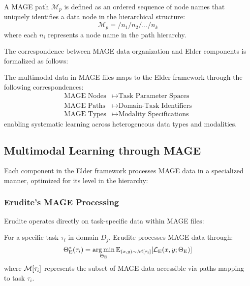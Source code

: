\begin{definition}
A MAGE path $\mathcal{M}_p$ is defined as an ordered sequence of node names that uniquely identifies a data node in the hierarchical structure:
\begin{equation}
\mathcal{M}_p = /n_1/n_2/.../n_k
\end{equation}
where each $n_i$ represents a node name in the path hierarchy.
\end{definition}

The correspondence between MAGE data organization and Elder components is formalized as follows:

\begin{proposition}
The multimodal data in MAGE files maps to the Elder framework through the following correspondences:
\begin{align}
\text{MAGE Nodes} &\mapsto \text{Task Parameter Spaces} \\
\text{MAGE Paths} &\mapsto \text{Domain-Task Identifiers} \\
\text{MAGE Types} &\mapsto \text{Modality Specifications}
\end{align}
enabling systematic learning across heterogeneous data types and modalities.
\end{proposition}

\subsection{Multimodal Learning through MAGE}

Each component in the Elder framework processes MAGE data in a specialized manner, optimized for its level in the hierarchy:

\subsubsection{Erudite's MAGE Processing}

Erudite operates directly on task-specific data within MAGE files:

\begin{theorem}
For a specific task $\tau_i$ in domain $D_j$, Erudite processes MAGE data through:
\begin{equation}
\Theta_{\text{E}}^{*}(\tau_i) = \mathop{\mathrm{arg\,min}}_{\Theta_{\text{E}}} \mathbb{E}_{(x,y) \sim \mathcal{M}[\tau_i]} [\mathcal{L}_{\text{E}}(x, y; \Theta_{\text{E}})]
\end{equation}
where $\mathcal{M}[\tau_i]$ represents the subset of MAGE data accessible via paths mapping to task $\tau_i$.
\end{theorem}

